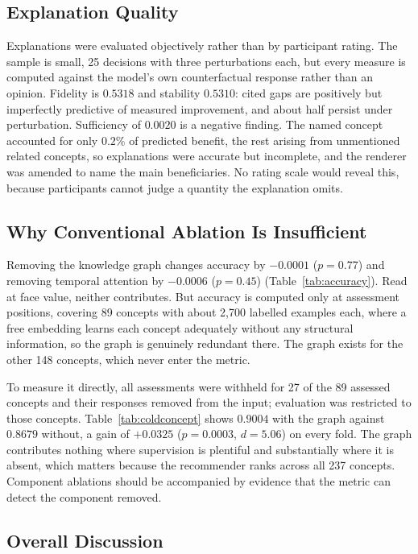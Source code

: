 \documentclass[conference]{IEEEtran}
\begin{document}
\subsection{Explanation Quality}

Explanations were evaluated objectively rather than by participant rating. The sample is
small, 25 decisions with three perturbations each, but every measure is computed against
the model's own counterfactual response rather than an opinion. Fidelity is $0.5318$ and stability
$0.5310$: cited gaps are positively but imperfectly predictive of measured improvement, and
about half persist under perturbation. Sufficiency of $0.0020$ is a negative finding. The
named concept accounted for only $0.2\%$ of predicted benefit, the rest arising from
unmentioned related concepts, so explanations were accurate but incomplete, and the renderer was amended to name the
main beneficiaries. No rating scale would reveal this, because participants cannot judge
a quantity the explanation omits.

\subsection{Why Conventional Ablation Is Insufficient}

Removing the knowledge graph changes accuracy by $-0.0001$ ($p = 0.77$) and removing
temporal attention by $-0.0006$ ($p = 0.45$) (Table~\ref{tab:accuracy}). Read at face
value, neither contributes. But accuracy is computed only at assessment positions, covering
89 concepts with about 2{,}700 labelled examples each, where a free embedding learns each concept
adequately without any structural information, so the graph is genuinely redundant there. The graph exists for the other 148 concepts, which never enter the metric.

To measure it directly, all assessments were withheld for 27 of the 89 assessed concepts
and their responses removed from the input; evaluation was restricted to those concepts.
Table~\ref{tab:coldconcept} shows $0.9004$ with the graph against $0.8679$ without, a gain
of $+0.0325$ ($p = 0.0003$, $d = 5.06$) on every fold. The graph contributes nothing where
supervision is plentiful and substantially where it is absent, which matters because the
recommender ranks across all 237 concepts. Component ablations should be accompanied by
evidence that the metric can detect the component removed.

\subsection{Overall Discussion}
\end{document}
